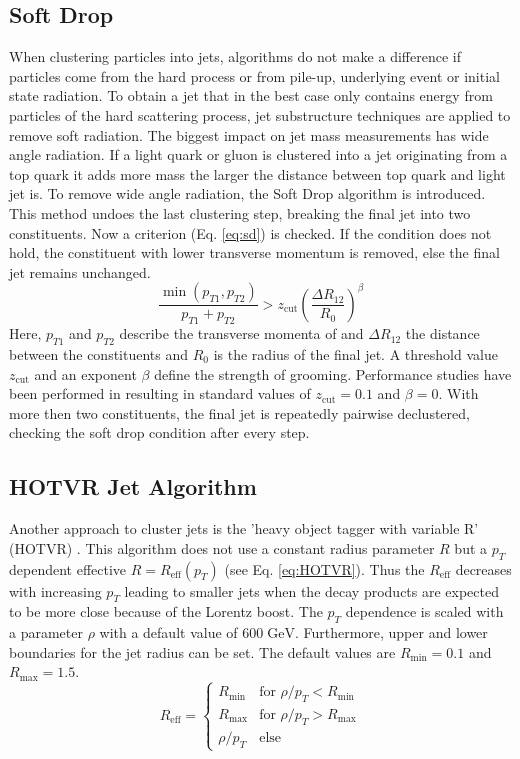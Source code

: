 \subsection{Soft Drop}
\label{sec:sd}
	When clustering particles into jets, algorithms do not make a difference if particles come from the hard process or from pile-up, underlying event or initial state radiation. To obtain a jet that in the best case only contains energy from particles of the hard scattering process, jet substructure techniques are applied to remove soft radiation. The biggest impact on jet mass measurements has wide angle radiation. If a light quark or gluon is clustered into a jet originating from a top quark it adds more mass the larger the distance between top quark and light jet is. To remove wide angle radiation, the Soft Drop algorithm \cite{softdrop} is introduced. This method undoes the last clustering step, breaking the final jet into two constituents. Now a criterion (Eq. \ref{eq:sd}) is checked. If the condition does not hold, the constituent with lower transverse momentum is removed, else the final jet remains unchanged. 
	\begin{equation}
	\frac{\min(p_{T1}, p_{T2})}{p_{T1} + p_{T2}} > z_\text{cut} \left( \frac{\Delta R_{12}}{R_0}\right)^\beta
	\label{eq:sd}
	\end{equation}
	Here, $p_{T1}$ and $p_{T2}$ describe the transverse momenta of and $\Delta R_{12}$ the distance between the constituents and $R_0$ is the radius of the final jet. A threshold value $z_\text{cut}$ and an exponent $\beta$ define the strength of grooming. Performance studies have been performed in \cite{softdropvalues} resulting in standard values of $z_\text{cut} = 0.1$ and $\beta =0$.	With more then two constituents, the final jet is repeatedly pairwise declustered, checking the soft drop condition after every step.
	
\subsection{HOTVR Jet Algorithm}
	Another approach to cluster jets is the 'heavy object tagger with variable R' (HOTVR) \cite{hotvr}. This algorithm does not use a constant radius parameter $R$ but a $p_T$ dependent effective $R=R_\text{eff}(p_T)$ (see Eq. \ref{eq:HOTVR}). Thus the $R_\text{eff}$ decreases with increasing $p_T$ leading to smaller jets when the decay products are expected to be more close because of the Lorentz boost. The $p_T$ dependence is scaled with a parameter $\rho$ with a default value of $600\;\text{GeV}$. Furthermore, upper and lower boundaries for the jet radius can be set. The default values are $R_\text{min} = 0.1$ and $R_\text{max} = 1.5$. 	
	\begin{equation}
	\label{eq:HOTVR}
	  R_\text{eff} =
	   \begin{cases}
	     R_\text{min} & \text{for } \rho / p_T < R_\text{min} \\
	     R_\text{max} & \text{for } \rho / p_T > R_\text{max} \\
	     \rho / p_T & \text{else}  
	   \end{cases}
	\end{equation}
	
